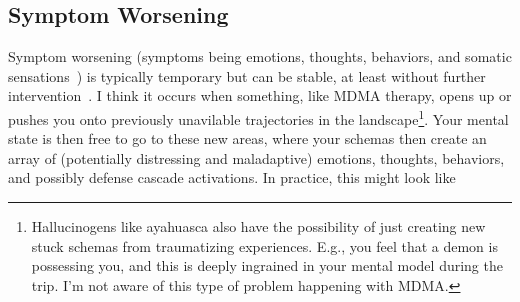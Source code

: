 \documentclass[11pt,oneside]{book}
\let\cite\parencite
\begin{document}
\subsection*{Symptom Worsening}
Symptom worsening (symptoms being emotions, thoughts, behaviors, and somatic sensations~\cite{eckerUnlocking}) is typically temporary but can be stable, at least without further intervention~\cite{evans2023extended}. I think it occurs when something, like MDMA therapy, opens up or pushes you onto previously unavilable trajectories in the landscape\footnote{Hallucinogens like ayahuasca also have the possibility of just creating new stuck schemas from traumatizing experiences. E.g., you feel that a demon is possessing you, and this is deeply ingrained in your mental model during the trip. I'm not aware of this type of problem happening with MDMA.}. Your mental state is then free to go to these new areas, where your schemas then create an array of (potentially distressing and maladaptive) emotions, thoughts, behaviors, and possibly defense cascade activations. In practice, this might look like
\end{document}
